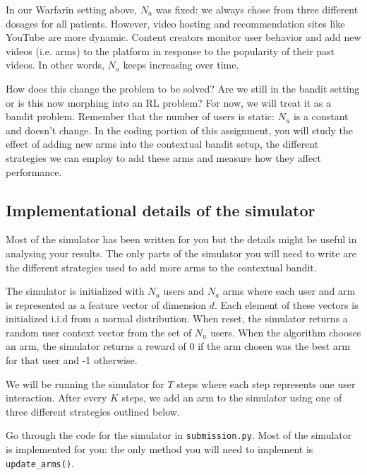 \noindent
In our Warfarin setting above, $N_a$ was fixed: we always chose from three different dosages for all patients. However, video hosting and recommendation sites like YouTube are more dynamic. Content creators monitor user behavior and add new videos (i.e. arms) to the platform in response to the popularity of their past videos. In other words, $N_a$ keeps increasing over time. 

\noindent
How does this change the problem to be solved? Are we still in the bandit setting or is this now morphing into an RL problem? For now, we will treat it as a bandit problem. Remember that the number of users is static: $N_u$ is a constant and doesn't change. In the coding portion of this assignment, you will study the effect of adding new arms into the contextual bandit setup, the different strategies we can employ to add these arms and measure how they affect performance. 

\subsection*{Implementational details of the simulator}
Most of the simulator has been written for you but the details might be useful in analysing your results. The only parts of the simulator you will need to write are the different strategies used to add more arms to the contextual bandit. 

\noindent
The simulator is initialized with $N_u$ users and $N_a$ arms where each user and arm is represented as a feature vector of dimension $d$. Each element of these vectors is initialized i.i.d from a normal distribution. When reset, the simulator returns a random user context vector from the set of $N_u$ users.  When the algorithm chooses an arm, the simulator returns a reward of 0 if the arm chosen was the best arm for that user and -1 otherwise.

\noindent
We will be running the simulator for $T$ steps where each step represents one user interaction. After every $K$ steps, we add an arm to the simulator using one of three different strategies outlined below.

\noindent
Go through the code for the simulator in \texttt{submission.py}. Most of the simulator is implemented for you: the only method you will need to implement is \texttt{update\_arms()}. 

\begin{enumerate}[(a)]
    
    
    
    
\end{enumerate}